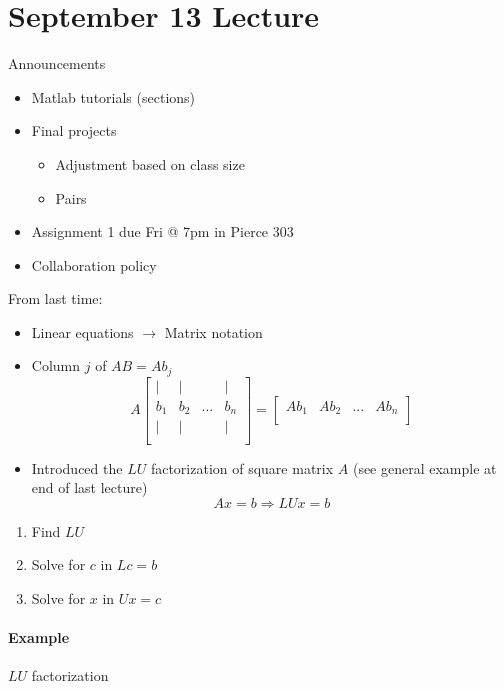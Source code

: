 \documentclass[12pt]{article}
\newcommand{\<}{\langle}
\renewcommand{\>}{\rangle}
\begin{document}
\section{September 13 Lecture}

Announcements

\begin{itemize}
	\item Matlab tutorials (sections)
	\item Final projects
	\begin{itemize}
		\item Adjustment based on class size
		\item Pairs
	\end{itemize}
	\item Assignment 1 due Fri @ 7pm in Pierce 303
	\item Collaboration policy
\end{itemize}

From last time:

\begin{itemize}
	\item Linear equations $\rightarrow$ Matrix notation
	\item Column $j$ of $AB=Ab_j$
	\[
		A
		\begin{bmatrix}
			| & | &  & | \\
			b_1 & b_2 & ... & b_n \\
			| & | &  & | \\
		\end{bmatrix} = 
		\begin{bmatrix}
			Ab_1 & Ab_2 & ... & Ab_n \\
		\end{bmatrix} 
	\]
	\item Introduced the $LU$ factorization of square matrix $A$ (see general example at end of last lecture)
	\[
		Ax=b \Rightarrow LUx = b
	\]
\end{itemize}

\begin{enumerate}
	\item Find $LU$
	\item Solve for $c$ in $Lc=b$
	\item Solve for $x$ in $Ux=c$
\end{enumerate}

\paragraph{Example} $LU$ factorization
\end{document}
